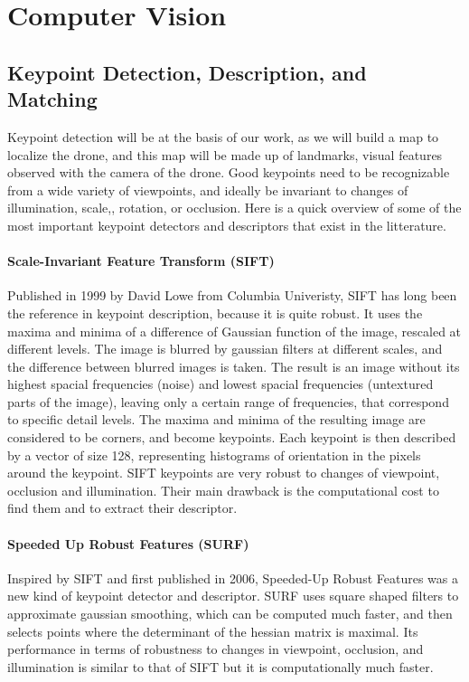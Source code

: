 \section{Computer Vision}
\subsection{Keypoint Detection, Description, and Matching} \label{sec:sota_keypoints}
Keypoint detection will be at the basis of our work, as we will build a map to localize the drone, and this map will be made up of landmarks, visual features observed with the camera of the drone. Good keypoints need to be recognizable from a wide variety of viewpoints, and ideally be invariant to changes of illumination, scale,, rotation, or occlusion. Here is a quick overview of some of the most important keypoint detectors and descriptors that exist in the litterature.\\

\paragraph{Scale-Invariant Feature Transform (SIFT)} Published in 1999 by David Lowe from Columbia Univeristy, SIFT \cite{sift} has long been the reference in keypoint description, because it is quite robust. It uses the maxima and minima of a difference of Gaussian function of the image, rescaled at different levels. The image is blurred by gaussian filters at different scales, and the difference between blurred images is taken. The result is an image without its highest spacial frequencies (noise) and lowest spacial frequencies (untextured parts of the image), leaving only a certain range of frequencies, that correspond to specific detail levels. The maxima and minima of the resulting image are considered to be corners, and become keypoints. Each keypoint is then described by a vector of size \num{128}, representing histograms of orientation in the pixels around the keypoint. SIFT keypoints are very robust to changes of viewpoint, occlusion and illumination. Their main drawback is the computational cost to find them and to extract their descriptor.

\paragraph{Speeded Up Robust Features (SURF)}
Inspired by SIFT and first published in 2006, Speeded-Up Robust Features \cite{bay_surf} was a new kind of keypoint detector and descriptor. SURF uses square shaped filters to approximate gaussian smoothing, which can be computed much faster, and then selects points where the determinant of the hessian matrix is maximal. Its performance in terms of robustness to changes in viewpoint, occlusion, and illumination is similar to that of SIFT but it is computationally much faster.


